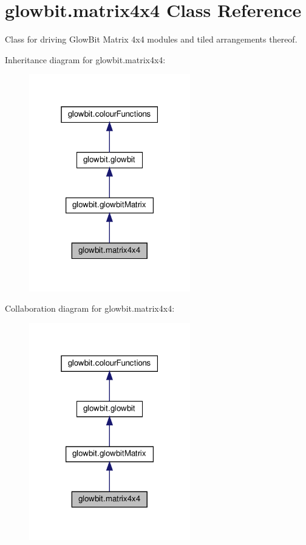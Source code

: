 \hypertarget{classglowbit_1_1matrix4x4}{}\section{glowbit.\+matrix4x4 Class Reference}
\label{classglowbit_1_1matrix4x4}


Class for driving Glow\+Bit Matrix 4x4 modules and tiled arrangements thereof.  




Inheritance diagram for glowbit.\+matrix4x4\+:\nopagebreak
\begin{figure}[H]
\begin{center}
\leavevmode
\includegraphics[width=199pt]{classglowbit_1_1matrix4x4__inherit__graph}
\end{center}
\end{figure}


Collaboration diagram for glowbit.\+matrix4x4\+:\nopagebreak
\begin{figure}[H]
\begin{center}
\leavevmode
\includegraphics[width=199pt]{classglowbit_1_1matrix4x4__coll__graph}
\end{center}
\end{figure}

